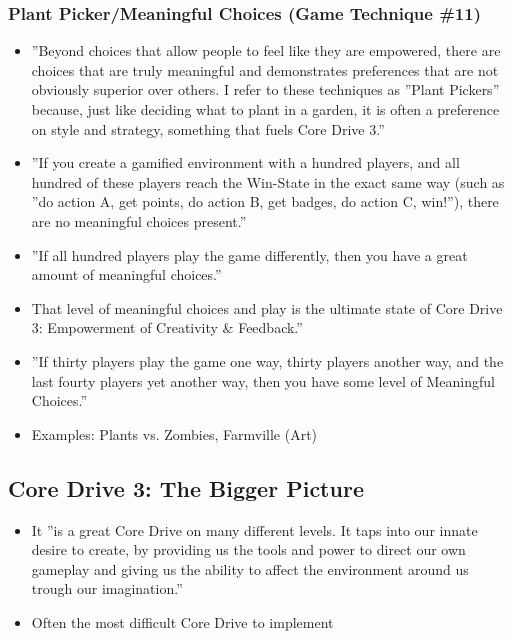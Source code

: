\subsubsection{Plant Picker/Meaningful Choices (Game Technique \#11)}
\begin{itemize}
    \item ''Beyond choices that allow people to feel like they are empowered, there are choices that are truly meaningful and demonstrates preferences that are not obviously superior over others. I refer to these techniques as ''Plant Pickers'' because, just like deciding what to plant in a garden, it is often a preference on style and strategy, something that fuels Core Drive 3.''
    \item ''If you create a gamified environment with a hundred players, and all hundred of these players reach the Win-State in the exact same way (such as ''do action A, get points, do action B, get badges, do action C, win!''), there are no meaningful choices present.''
    \item ''If all hundred players play the game differently, then you have a great amount of meaningful choices.''
    \item That level of meaningful choices and play is the ultimate state of Core Drive 3: Empowerment of Creativity \& Feedback.''
    \item ''If thirty players play the game one way, thirty players another way, and the last fourty players yet another way, then you have some level of Meaningful Choices.''
    \item Examples: Plants vs. Zombies, Farmville (Art)
\end{itemize}

\subsection{Core Drive 3: The Bigger Picture}
\begin{itemize}
    \item It ''is a great Core Drive on many different levels. It taps into our innate desire to create, by providing us the tools and power to direct our own gameplay and giving us the ability to affect the environment around us trough our imagination.''
    \item Often the most difficult Core Drive to implement
\end{itemize}